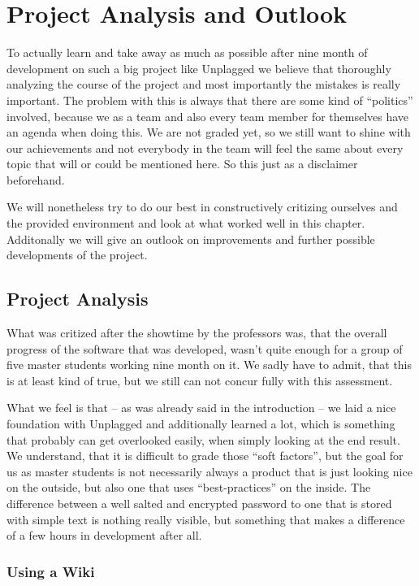 \chapter{Project Analysis and Outlook}\label{chap:summaryAndOutlook}

To actually learn and take away as much as possible after nine month of development on such a big project like Unplagged we believe that thoroughly analyzing the course of the project and most importantly the mistakes is really important. The problem with this is always that there are some kind of \enquote{politics} involved, because we as a team and also every team member for themselves have an agenda when doing this. We are not graded yet, so we still want to shine with our achievements and not everybody in the team will feel the same about every topic that will or could be mentioned here. So this just as a disclaimer beforehand. 

We will nonetheless try to do our best in constructively critizing ourselves and the provided environment and look at what worked well in this chapter. Additonally we will give an outlook on improvements and further possible developments of the project.

\section{Project Analysis}

What was critized after the showtime by the professors was, that the overall progress of the software that was developed, wasn't quite enough for a group of five master students working nine month on it. We sadly have to admit, that this is at least kind of true, but we still can not concur fully with this assessment.

What we feel is that -- as was already said in the introduction -- we laid a nice foundation with Unplagged and additionally learned a lot, which is something that probably can get overlooked easily, when simply looking at the end result. We understand, that it is difficult to grade those \enquote{soft factors}, but the goal for us as master students is not necessarily always a product that is just looking nice on the outside, but also one that uses \enquote{best-practices} on the inside. 
The difference between a well salted and encrypted password to one that is stored with simple text is nothing really visible, but something that makes a difference of a few hours in development after all.

\subsection{Using a Wiki}


